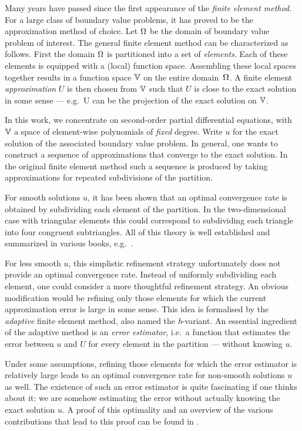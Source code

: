 \documentclass[thesis.tex]{subfiles}
\begin{document}
Many years have passed since the first appearance of the \emph{finite element method}. 
For a large class of boundary value problems, it has proved to be the approximation method of choice. 
Let $\Omega$ be the domain of boundary value problem of interest. The general finite element method can be characterized as follows.
First the domain $\Omega$ is partitioned into a set of \emph{elements}.  Each of these elements is equipped with a (local) function space.
Assembling these local spaces together results in a function space $\mathbb{V}$ on the entire domain~$\Omega$. A finite element \emph{approximation} $U$
is then chosen from $\mathbb{V}$ such that $U$ is close to the exact solution in some sense 
--- e.g.~U can be the projection of the exact solution on $\mathbb{V}$. 

In this work, we concentrate on second-order partial differential equations, with $\mathbb{V}$
a space of element-wise polynomials of \emph{fixed} degree. Write $u$ for the exact solution
of the associated boundary value problem. In general, one wants to construct a sequence of approximations that converge to
the exact solution. In the original finite element method such a sequence is produced by taking
approximations for repeated subdivisions of the partition. 

For smooth solutions $u$, it has been shown
that an optimal convergence rate is obtained by subdividing each element of the partition. 
In the two-dimensional case with triangular elements this could correspond to subdividing each triangle into four
congruent subtriangles. All of this theory is well established and summarized  in various books, e.g.~\cite{brenner, zienkiewicz1977finite}.

For less smooth $u$, this simplistic refinement strategy unfortunately does not provide an optimal convergence rate.
Instead of uniformly subdividing each element, one could consider a more thoughtful refinement strategy.
An obvious modification would be refining only those elements for which the current approximation error is large in some sense.
This idea is formalised by the \emph{adaptive} finite element method, also named the \emph{h}-variant.
An essential ingredient of the adaptive method is an \emph{error estimator}, i.e.~a function that estimates
the error between $u$ and $U$ for every element in the partition --- without knowing $u$. 

Under some assumptions, refining those
elements for which the error estimator is relatively large leads to an optimal convergence rate for non-smooth
solutions $u$ as well. The existence of such an error estimator is quite fascinating  if one thinks about it: we
are somehow estimating the error without actually knowing the exact solution $u$. 
A proof of this optimality and an overview of the various contributions that lead to this proof can be found in \cite{cascon2008}.
\end{document}
